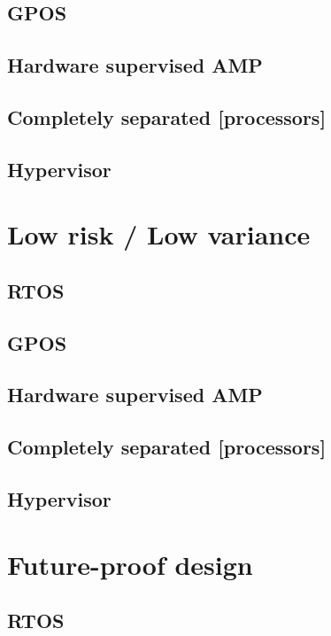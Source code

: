 \subsection{GPOS}
\subsection{Hardware supervised AMP}
\subsection{Completely separated [processors]}
\subsection{Hypervisor}


\section{Low risk / Low variance}
\subsection{RTOS}
\subsection{GPOS}
\subsection{Hardware supervised AMP}
\subsection{Completely separated [processors]}
\subsection{Hypervisor}


\section{Future-proof design}
\subsection{RTOS}
